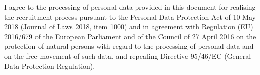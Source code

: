 I agree to the processing of personal data provided in this document for realising the recruitment process pursuant to the Personal Data Protection Act of 10 May 2018 (Journal of Laws 2018, item 1000) and in agreement with Regulation (EU) 2016/679 of the European Parliament and of the Council of 27 April 2016 on the protection of natural persons with regard to the processing of personal data and on the free movement of such data, and repealing Directive 95/46/EC (General Data Protection Regulation).